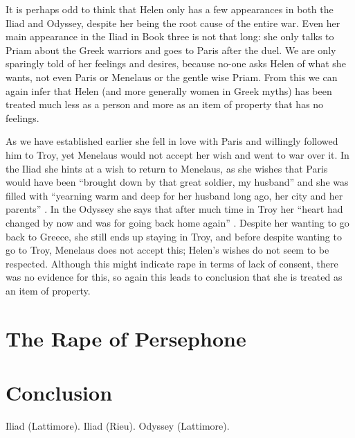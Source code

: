 \documentclass[11pt]{article}
\begin{document}
It is perhaps odd to think that Helen only has a few appearances in both the Iliad and Odyssey, despite her being the root cause of the entire war.
Even her main appearance in the Iliad in Book three is not that long: she only talks to Priam about the Greek warriors and goes to Paris after the duel.
We are only sparingly told of her feelings and desires, because no-one asks Helen of what she wants, not even Paris or Menelaus or the gentle wise Priam.
From this we can again infer that Helen (and more generally women in Greek myths) has been treated much less as a person and more as an item of property that has no feelings.

As we have established earlier she fell in love with Paris and willingly followed him to Troy, yet Menelaus would not accept her wish and went to war over it.
In the Iliad she hints at a wish to return to Menelaus, as she wishes that Paris would have been ``brought down by that great soldier, my husband'' and she was filled with ``yearning warm and deep for her husband long ago, her city and her parents'' \cite[book 1, line 500/168]{iliad}.
In the Odyssey she says that after much time in Troy her ``heart had changed by now and was for going back home again'' \cite[book 11, line 260]{odyssey}.
Despite her wanting to go back to Greece, she still ends up staying in Troy, and before despite wanting to go to Troy, Menelaus does not accept this; Helen's wishes do not seem to be respected.
Although this might indicate rape in terms of lack of consent, there was no evidence for this, so again this leads to conclusion that she is treated as an item of property.


\section{The Rape of Persephone}




\section{Conclusion}


\newpage

\begin{thebibliography}{9}
		Iliad (Lattimore).
		Iliad (Rieu).
		Odyssey (Lattimore).
\end{thebibliography}
\end{document}
